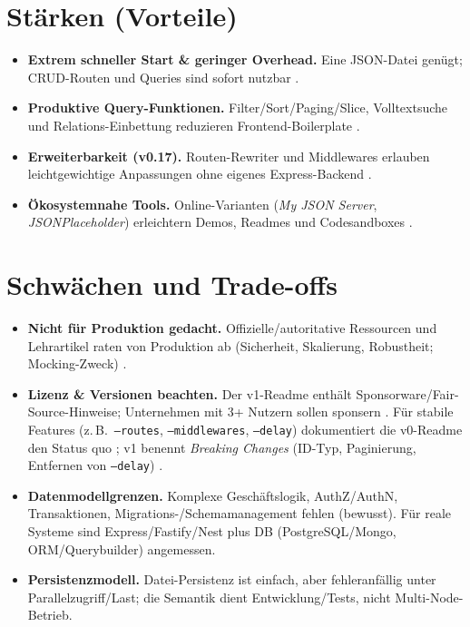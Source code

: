 \documentclass[11pt,a4paper]{article}
\begin{document}
\section{Stärken (Vorteile)}
\label{sec:pros}
\begin{itemize}
  \item \textbf{Extrem schneller Start \& geringer Overhead.} Eine JSON-Datei genügt; CRUD-Routen und Queries sind sofort nutzbar \cite[Abschnitt \enquote{Usage}]{jsonserver-github-v1}. 
  \item \textbf{Produktive Query-Funktionen.} Filter/Sort/Paging/Slice, Volltextsuche und Relations-Einbettung reduzieren Frontend-Boilerplate \cite[Abschnitt \enquote{Params}]{jsonserver-github-v1}.
  \item \textbf{Erweiterbarkeit (v0.17).} Routen-Rewriter und Middlewares erlauben leichtgewichtige Anpassungen ohne eigenes Express-Backend \cite{jsonserver-github-v0}.
  \item \textbf{Ökosystemnahe Tools.} Online-Varianten (\emph{My JSON Server}, \emph{JSONPlaceholder}) erleichtern Demos, Readmes und Codesandboxes \cite{my-json-server,jsonplaceholder}.
\end{itemize}

\section{Schwächen und Trade-offs}
\label{sec:tradeoffs}
\begin{itemize}
  \item \textbf{Nicht für Produktion gedacht.} Offizielle/autoritative Ressourcen und Lehrartikel raten von Produktion ab (Sicherheit, Skalierung, Robustheit; Mocking-Zweck) \cite{freecodecamp,sitepoint}. 
  \item \textbf{Lizenz \& Versionen beachten.} Der v1-Readme enthält Sponsorware/Fair-Source-Hinweise; Unternehmen mit 3{+} Nutzern sollen sponsern \cite[Hinweise im Readme]{jsonserver-github-v1}. Für stabile Features (z.\,B.\ \texttt{--routes}, \texttt{--middlewares}, \texttt{--delay}) dokumentiert die v0-Readme den Status quo \cite{jsonserver-github-v0}; v1 benennt \emph{Breaking Changes} (ID-Typ, Paginierung, Entfernen von \texttt{--delay}) \cite[Abschnitt \enquote{Notable differences with v0.17}]{jsonserver-github-v1}.
  \item \textbf{Datenmodellgrenzen.} Komplexe Geschäftslogik, AuthZ/AuthN, Transaktionen, Migrations-/Schemamanagement fehlen (bewusst). Für reale Systeme sind Express/Fastify/Nest plus DB (PostgreSQL/Mongo, ORM/Querybuilder) angemessen. 
  \item \textbf{Persistenzmodell.} Datei-Persistenz ist einfach, aber fehleranfällig unter Parallelzugriff/Last; die Semantik dient Entwicklung/Tests, nicht Multi-Node-Betrieb.
\end{itemize}
\end{document}
